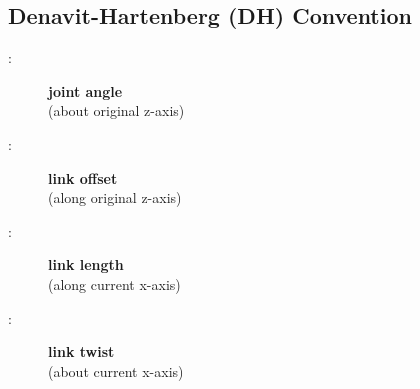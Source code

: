 \subsection{Denavit-Hartenberg (DH) Convention}
    \vspace{0.5em}
    \begin{center}
    \end{center}

    \begin{minipage}{0.54\linewidth}
        \begin{center}
        \end{center}
    \end{minipage}
    \begin{minipage}{0.45\linewidth}
        \small
        \begin{description}
            \item[\boldmath{$\theta$}:] \textbf{joint angle}\\ (about original z-axis) 
            \item[:]      \textbf{link offset}\\ (along original z-axis) 
            \item[:]      \textbf{link length}\\ (along current x-axis) 
            \item[\boldmath{$\alpha$}:] \textbf{link twist} \\ (about current x-axis) 
        \end{description}
    \end{minipage}
